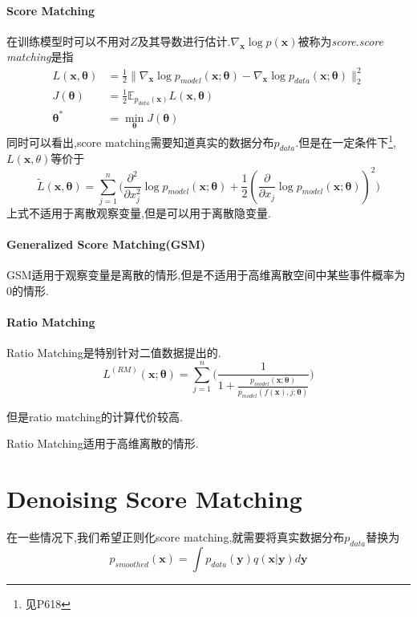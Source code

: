 \paragraph{Score Matching}在训练模型时可以不用对$Z$及其导数进行估计.$\nabla_{\bm x}\log p(\bm x)$被称为\textit{score}.\textit{score matching}是指
\begin{equation}\begin{split}
L(\bm x,\bm\theta)&=\frac{1}{2}\|\nabla_{\bm x}\log p_{model}(\bm x;\bm\theta)-\nabla_{\bm x}\log p_{data}(\bm x;\bm\theta)\|_2^2\\
J(\bm\theta)&=\frac{1}{2}\mathbb E_{p_{data}(\bm x)}L(\bm x,\bm\theta)\\
{\bm\theta}^\ast&=\min_{\bm\theta} J(\bm\theta)
\end{split}\end{equation}
同时可以看出,score matching需要知道真实的数据分布$p_{data}$.但是在一定条件下\footnote{见P618},$L(\bm x,\theta)$等价于
\begin{equation}
\tilde L(\bm x,\bm\theta)=\sum_{j=1}^n\Big(\frac{\partial^2}{\partial x_j^2}\log p_{model}(\bm x;\bm\theta)+\frac{1}{2}(\frac{\partial}{\partial x_j}\log p_{model}(\bm x;\bm\theta))^2\Big)
\end{equation}
上式不适用于离散观察变量,但是可以用于离散隐变量.

\paragraph{Generalized Score Matching(GSM)}GSM适用于观察变量是离散的情形,但是不适用于高维离散空间中某些事件概率为$0$的情形.

\paragraph{Ratio Matching} Ratio Matching是特别针对二值数据提出的.
\begin{equation}
L^{(RM)}(\bm x;\bm\theta)=\sum_{j=1}^n\Big(\frac{1}{1+\frac{p_{model}(\bm x;\bm\theta)}{p_{model}(f(\bm x), j;\bm\theta)}}\Big)
\end{equation}

但是ratio matching的计算代价较高.

Ratio Matching适用于高维离散的情形.

\section{Denoising Score Matching}

在一些情况下,我们希望正则化score matching,就需要将真实数据分布$p_{data}$替换为
\begin{equation}
p_{smoothed}(\bm x)=\int p_{data}(\bm y)q(\bm x|\bm y)d\bm y
\end{equation}

